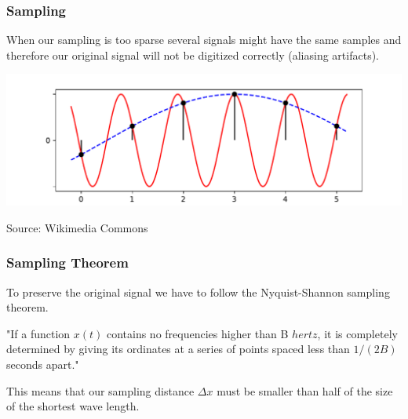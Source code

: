 \begin{frame}
    \frametitle{Sampling}
    When our sampling is too sparse several signals might have the same samples and therefore our original signal will not be digitized correctly (aliasing artifacts).\newline

    \begin{center}
        \includegraphics[height=.4\textheight ]{images/AliasingSines.pdf}
        \begin{flushright}
            \scriptsize Source: Wikimedia Commons$\quad$
        \end{flushright}
    \end{center}
\end{frame}



\begin{frame}
    \frametitle{Sampling Theorem}
    To preserve the original signal we have to follow the Nyquist-Shannon sampling theorem.\newline

    \begin{myDefinition}
        "If a function $x(t)$ contains no frequencies higher than B $hertz$, it is completely determined by giving its ordinates at a series of points spaced less than $1/(2B)$ seconds apart."
    \end{myDefinition}

    \vspace{5mm}

    This means that our sampling distance $\Delta x$ must be smaller than half of the size of the shortest wave length.
\end{frame}

